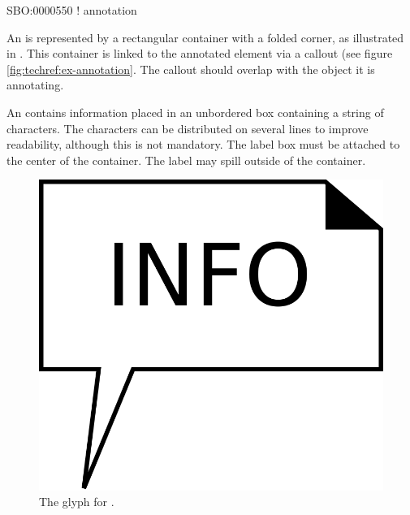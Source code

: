 \begin{glyphDescription}

\glyphSboTerm SBO:0000550 ! annotation

\glyphContainer An  is represented by a rectangular
container with a folded corner, as illustrated in
. This container is linked to the annotated element
via a callout (see figure \ref{fig:techref:ex-annotation}. The callout should
overlap with the object it is annotating.

\glyphLabel An  contains information placed in an
unbordered box containing a string of characters.  The characters can
be distributed on several lines to improve readability, although this
is not mandatory.  The label box must be attached to the center of the
container. The label may spill outside of the container.

\end{glyphDescription}

\begin{figure}[htb]
  \centering
  \includegraphics[scale = 0.3]{images/annotation}
  \caption{The \PD glyph for .}
  \label{fig:techref:annotation}
\end{figure}

